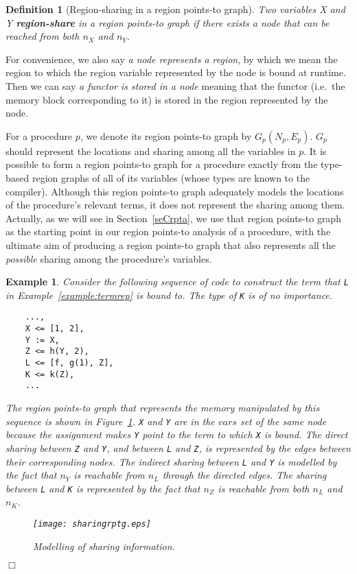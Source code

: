 \documentclass{tlp}
\newtheorem{definition}{Definition} \newtheorem{example}{Example} \let\from=\leftarrow
\def\varset{\mathit{vars}}
\newcommand{\code}[1]{{\tt#1}}
\begin{document}
\begin{definition}[Region-sharing in a region points-to graph]
\label{definition:region-sharing}
Two variables X and Y {\bf region-share} in a region points-to graph
if there exists a node that can be reached from both $n_X$ and $n_Y$.
\end{definition}

For convenience, we also say \emph{a node represents a region},
by which we mean the region to which
the region variable represented by the node is bound at runtime.
Then we can say \emph{a functor is stored in a node} meaning
that the functor (i.e.\ the memory block corresponding to it)
is stored in the region represented by the node.

For a procedure $p$,
we denote its region points-to graph by $G_p(N_p, E_p)$.
$G_p$ should represent the locations and sharing
among all the variables in $p$.
It is possible to form a region points-to graph for a procedure
exactly from the type-based region graphs of all of its variables
(whose types are known to the compiler).
Although this region points-to graph adequately models
the locations of the procedure's relevant terms,
it does not represent the sharing among them.
Actually, as we will see in Section~\ref{seCrpta},
we use that region points-to graph as the starting point
in our region points-to analysis of a procedure,
with the ultimate aim of producing a region points-to graph
that also represents all the \emph{possible} sharing
among the procedure's variables.

\begin{example}
Consider the following sequence of code to construct the term
that \code{L} in Example~\ref{example:termrep} is bound to.
The type of \code{K} is of no importance.
\begin{verbatim}
    ...,
    X <= [1, 2],
    Y := X,
    Z <= h(Y, 2),
    L <= [f, g(1), Z],
    K <= k(Z),
    ...
\end{verbatim}
The region points-to graph that represents
the memory manipulated by this sequence is shown in Figure~\ref{fig:sharing}.
\code{X} and \code{Y} are in the $\varset$ set of the same node
because the assignment makes \code{Y} point to the term
to which \code{X} is bound.
The direct sharing between \code{Z} and \code{Y},
and between \code{L} and \code{Z},
is represented by the edges between their corresponding nodes.
The indirect sharing between \code{L} and \code{Y} is modelled
by the fact that $n_Y$ is reachable from $n_L$ through the directed edges.
The sharing between \code{L} and \code{K} is represented by the fact that
$n_Z$ is reachable from both $n_L$ and $n_K$.
\begin{figure}[htp]
\centering
\texttt{[image: sharingrptg.eps]}
\caption{Modelling of sharing information.}
\label{fig:sharing}
\end{figure}
\label{example:sharingrptg}
\hfill $\Box$
\end{example}
\end{document}
